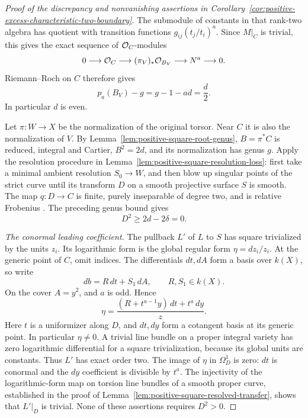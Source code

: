 \begin{proof}[Proof of the discrepancy and nonvanishing assertions in Corollary~\ref{cor:positive-excess-characteristic-two-boundary}]
The submodule of constants in that rank-two algebra has quotient
with transition functions $g_{ij}(t_j/t_i)^a$. Since $M|_C$
is trivial, this gives the exact sequence of $\mathcal O_C$-modules
\[
 0\longrightarrow\mathcal O_C\longrightarrow
 (\pi_V)_*\mathcal O_{B_V}\longrightarrow N^a\longrightarrow0.
\]
Riemann--Roch on $C$ therefore gives
\begin{equation}\label{eq:boundary-finite-genus}
 p_a(B_V)-g=g-1-ad=\frac d2.
\end{equation}
In particular $d$ is even.

Let $\pi:W\to X$ be the normalization of the original torsor.
Near $C$ it is also the normalization of $V$.
By Lemma~\ref{lem:positive-square-root-genus},
$B=\pi^*C$ is reduced, integral and Cartier, $B^2=2d$,
and its normalization has genus $g$.
Apply the resolution procedure in
Lemma~\ref{lem:positive-square-resolution-loss}: first take a
minimal ambient resolution $S_0\to W$, and then blow up singular
points of the strict curve until its transform $D$ on a smooth
projective surface $S$ is smooth. The map $q:D\to C$ is finite,
purely inseparable of degree two, and is relative Frobenius
\cite[Tag~0CCZ]{Stacks}. The preceding genus bound gives
\begin{equation}\label{eq:boundary-nonnegative-square}
 D^2\geq2d-2\delta=0.
\end{equation}

\smallskip\noindent
\emph{The conormal leading coefficient.}
The pullback $L'$ of $L$ to $S$ has square trivialized by the
units $z_i$. Its logarithmic form is the global regular form
$\eta=dz_i/z_i$. At the generic point of $C$, omit indices.
The differentials $dt,dA$ form a basis over $k(X)$, so write
\[
 db=R\,dt+S_1\,dA,\qquad R,S_1\in k(X).
\]
On the cover $A=y^2$, and $a$ is odd. Hence
\begin{equation}\label{eq:boundary-root-differential}
 \eta=\frac{(R+t^{a-1}y)\,dt+t^a\,dy}{z}.
\end{equation}
Here $t$ is a uniformizer along $D$, and $dt,dy$ form a
cotangent basis at its generic point. In particular $\eta\ne0$.
A trivial line bundle on a proper integral variety has zero
logarithmic differential for a square trivialization, because its
global units are constants. Thus $L'$ has exact order two.
The image of $\eta$ in $\Omega_D^1$ is zero: $dt$ is conormal
and the $dy$ coefficient is divisible by $t^a$.
The injectivity of the logarithmic-form map on torsion line bundles
of a smooth proper curve, established in the proof of
Lemma~\ref{lem:positive-square-resolved-transfer}, shows that
$L'|_D$ is trivial. None of these assertions requires $D^2>0$.


\end{proof}
